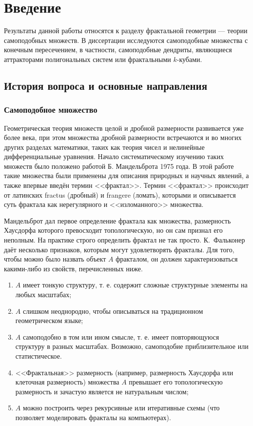 \chapter*{Введение}                         %

Результаты данной работы относятся к разделу фрактальной геометрии --- теории самоподобных множеств.
В диссертации исследуются самоподобные множества с конечным пересечением, в частности, самоподобные дендриты, являющиеся аттракторами полигональных систем или фрактальными $k$-кубами.

\section{История вопроса и основные направления}

\subsection{Самоподобное множество}

Геометрическая теория множеств целой и дробной размерности развивается уже более века, при этом множества дробной размерности встречаются и во многих других разделах математики, таких как теория чисел и нелинейные дифференциальные уравнения.
Начало систематическому изучению таких множеств было положено работой \cite{Man75} Б. Мандельброта 1975 года.
В этой работе такие множества были применены для описания природных и научных явлений, а также впервые введён термин <<фрактал>>.
Термин <<фрактал>> происходит от латинских fractus (дробный) и frangere (ломать), которыми и описывается суть фрактала как нерегулярного и <<изломанного>> множества.

Мандельброт дал первое определение фрактала как множества, размерность Хаусдорфа которого превосходит топологическую, но он сам признал его неполным.
На практике строго определить фрактал не так просто.
К.~Фальконер \cite{Falconer2004} даёт несколько признаков, которым могут удовлетворять фракталы.
Для того, чтобы можно было назвать объект $A$ фракталом, он должен характеризоваться какими-либо из свойств, перечисленных ниже.

\begin{enumerate}
\item $A$ имеет тонкую структуру, т. е. содержит сложные структурные элементы на любых масштабах;
\item $A$ слишком неоднородно, чтобы описываться на традиционном геометрическом языке;
\item $A$ самоподобно в том или ином смысле, т. е. имеет повторяющуюся структуру в разных масштабах. Возможно, самоподобие приблизительное или статистическое.
\item <<Фрактальная>> размерность (например, размерность Хаусдорфа или клеточная размерность) множества $A$  превышает его топологическую размерность и зачастую является не натуральным числом;
\item $A$ можно построить через рекурсивные или итеративные схемы (что позволяет моделировать фракталы на компьютерах).
\end{enumerate}



